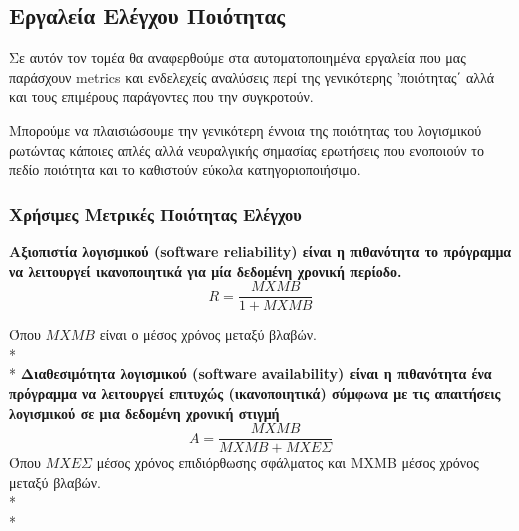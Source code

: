 \documentclass[a4paper, 11pt]{article}
\begin{document}
{{\subsection{Εργαλεία Ελέγχου Ποιότητας}
Σε αυτόν τον τομέα θα αναφερθούμε στα αυτοματοποιημένα εργαλεία που μας παράσχουν \textlatin{metrics} και ενδελεχείς αναλύσεις περί της γενικότερης 'ποιότητας΄ αλλά και τους επιμέρους παράγοντες που την συγκροτούν.

Μπορούμε να πλαισιώσουμε την γενικότερη έννοια της ποιότητας του λογισμικού ρωτώντας κάποιες απλές αλλά νευραλγικής σημασίας ερωτήσεις που ενοποιούν το πεδίο ποιότητα και το καθιστούν εύκολα κατηγοριοποιήσιμο.
\subsubsection{Χρήσιμες Μετρικές Ποιότητας Ελέγχου}
\textbf{Αξιοπιστία λογισμικού (\textlatin{software reliability}) είναι η πιθανότητα το πρόγραμμα να λειτουργεί ικανοποιητικά για μία δεδομένη χρονική περίοδο.} 
\[R = \frac{MXMB}{1 + MXMB}\]

Όπου \(ΜΧΜΒ\) είναι ο μέσος χρόνος μεταξύ βλαβών.\\*
\\*
\textbf{Διαθεσιμότητα λογισμικού (\textlatin{software availability}) είναι η πιθανότητα ένα πρόγραμμα να λειτουργεί επιτυχώς (ικανοποιητικά) σύμφωνα με τις απαιτήσεις λογισμικού σε μια δεδομένη χρονική στιγμή}
\[A = \frac{MXMB}{MXMB + ΜΧΕΣ} \]
Όπου \(ΜΧΕΣ\) μέσος χρόνος επιδιόρθωσης σφάλματος και ΜΧΜΒ μέσος χρόνος μεταξύ βλαβών.\\*
\\*
}}
\end{document}
